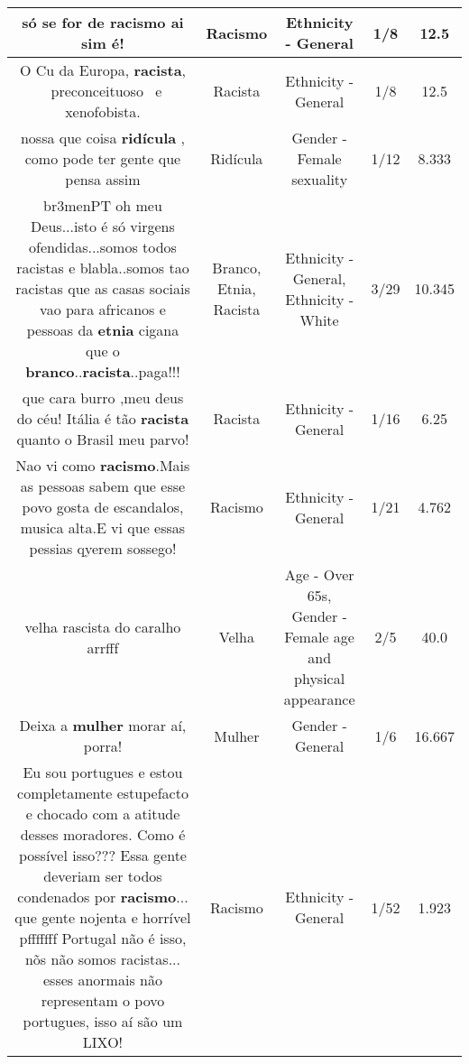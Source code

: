 \documentclass[11pt]{article}
\newlength\mylength
\begin{document}
\begin{center}
\begin{longtable}{|C{.65\mylength}|C{.30\mylength}|C{.12\mylength}|C{.12\mylength}|C{.12\mylength}|}
  \small só se for de \textbf{racismo} ai sim é!\normalsize   & Racismo & Ethnicity - General & 1/8 & 12.5 \\  \hline
  \small O Cu da Europa, \textbf{racista},  preconceituoso  e xenofobista.\normalsize   & Racista & Ethnicity - General & 1/8 & 12.5 \\  \hline
  \small nossa que coisa \textbf{ridícula} , como pode ter gente que pensa assim\normalsize   & Ridícula & Gender - Female sexuality & 1/12 & 8.333 \\  \hline
  \small br3menPT oh meu Deus...isto é só virgens ofendidas...somos todos racistas e blabla..somos tao racistas que as casas sociais vao para africanos e pessoas da \textbf{etnia} cigana que o \textbf{branco}..\textbf{racista}..paga!!!\normalsize   & Branco, Etnia, Racista & Ethnicity - General, Ethnicity - White & 3/29 & 10.345 \\  \hline
  \small que cara burro ,meu deus do céu! Itália é tão \textbf{racista} quanto o Brasil meu parvo!\normalsize   & Racista & Ethnicity - General & 1/16 & 6.25 \\  \hline
  \small Nao vi como \textbf{racismo}.Mais as pessoas sabem que esse povo gosta de escandalos, musica alta.E vi que essas pessias qyerem sossego!\normalsize   & Racismo & Ethnicity - General & 1/21 & 4.762 \\  \hline
  \small velha rascista do caralho arrfff\normalsize   & Velha & Age - Over 65s, Gender - Female age and physical appearance & 2/5 & 40.0 \\  \hline
  \small Deixa a \textbf{mulher} morar aí, porra!\normalsize   & Mulher & Gender - General & 1/6 & 16.667 \\  \hline
  \small Eu sou portugues e estou completamente estupefacto e chocado com a atitude desses moradores. Como é possível isso??? Essa gente deveriam ser todos condenados por \textbf{racismo}... que gente nojenta e horrível pfffffff Portugal não é isso, nõs não somos racistas... esses anormais não representam o povo portugues, isso aí são um LIXO!\normalsize   & Racismo & Ethnicity - General & 1/52 & 1.923 \\  \hline

\end{longtable}
\end{center}
\end{document}
